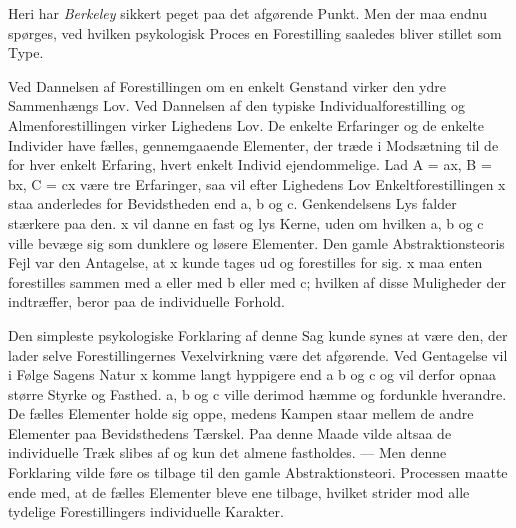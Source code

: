 \documentclass[12pt,a4paper,openany]{book}
\newcommand{\opage}[1]{\marginnote{\footnotesize\textit{[#1]}}}
\begin{document}
Heri har \emph{Berkeley} sikkert peget paa det afgørende Punkt. Men der
maa endnu spørges, ved hvilken psykologisk Proces en Forestilling
saaledes bliver stillet som Type.

Ved Dannelsen af Forestillingen om en enkelt Genstand virker den ydre
Sammenhængs Lov. Ved Dannelsen af den typiske Individualforestilling og
Almenforestillingen virker Lighedens Lov. De enkelte Erfaringer og de
enkelte Individer have fælles, gennemgaaende Elementer, der træde i
Modsætning til de for hver enkelt Erfaring, hvert enkelt Individ
ejendommelige. Lad A = ax, B = bx, C = cx være tre Erfaringer, saa vil
efter Lighedens Lov Enkeltforestillingen x staa anderledes for
Bevidstheden end a, b og c. Genkendelsens Lys falder stærkere paa den. x
vil danne en fast og lys Kerne, uden om hvilken a, b og c ville bevæge
sig som dunklere og løsere Elementer. Den gamle Abstraktionsteoris Fejl
var den Antagelse, at x kunde tages ud og forestilles for sig. x maa
enten forestilles sammen med a eller med b eller med c; hvilken af disse
Muligheder der indtræffer, beror paa de individuelle Forhold.


\opage{203}Den simpleste psykologiske Forklaring af denne Sag kunde
synes at være den, der lader selve Forestillingernes Vexelvirkning være
det afgørende. Ved Gentagelse vil i Følge Sagens Natur x komme langt
hyppigere end a b og c og vil derfor opnaa større Styrke og Fasthed. a,
b og c ville derimod hæmme og fordunkle hverandre. De fælles Elementer
holde sig oppe, medens Kampen staar mellem de andre Elementer paa
Bevidsthedens Tærskel. Paa denne Maade vilde altsaa de individuelle Træk
slibes af og kun det almene fastholdes. --- Men denne Forklaring vilde
føre os tilbage til den gamle Abstraktionsteori. Processen maatte ende
med, at de fælles Elementer bleve ene tilbage, hvilket strider mod alle
tydelige Forestillingers individuelle Karakter.
\end{document}
